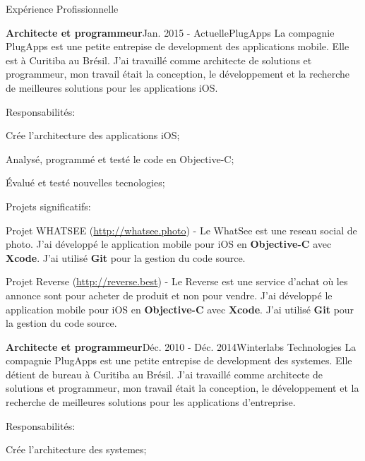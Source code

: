 \documentclass{resume}
\begin{document}
  \begin{rSection}{Expérience Profissionnelle}
    \begin{rSubsection}{\bf Architecte et programmeur}{Jan. 2015 - Actuelle}{PlugApps}{}
      La compagnie PlugApps est une petite entrepise de development des applications mobile. Elle est à Curitiba au Brésil. J'ai travaillé comme architecte de solutions et programmeur, mon travail était la conception, le développement et la recherche de meilleures solutions pour les applications iOS.
    \end{rSubsection}
    \begin{rSubsection}{Responsabilités:}{}{}{}
      \item Crée l’architecture des applications iOS;
      \item Analysé, programmé et testé le code en Objective-C;
      \item Évalué et testé nouvelles tecnologies;
    \end{rSubsection}
    \begin{rSubsection}{Projets significatifs:}{}{}{}
      \item Projet WHATSEE (\url{http://whatsee.photo}) - Le WhatSee est une reseau social de photo. J’ai développé le application mobile pour iOS en \textbf{Objective-C} avec \textbf{Xcode}. J’ai utilisé \textbf{Git} pour la gestion du code source. \\
      \item Projet Reverse (\url{http://reverse.best}) - Le Reverse est une service d'achat où les annonce sont pour acheter de produit et non pour vendre. J’ai développé le application mobile pour iOS en \textbf{Objective-C} avec \textbf{Xcode}. J’ai utilisé \textbf{Git} pour la gestion du code source. \\
    \end{rSubsection}
    \begin{rSubsection}{\bf Architecte et programmeur}{Déc. 2010 - Déc. 2014}{Winterlabs Technologies}{}
      La compagnie PlugApps est une petite entrepise de development des systemes. Elle détient de bureau à Curitiba au Brésil. J'ai travaillé comme architecte de solutions et programmeur, mon travail était la conception, le développement et la recherche de meilleures solutions pour les applications d'entreprise.
    \end{rSubsection}
    \begin{rSubsection}{Responsabilités:}{}{}{}
      \item Crée l’architecture des systemes;

\end{rSubsection}
\end{rSection}
\end{document}
